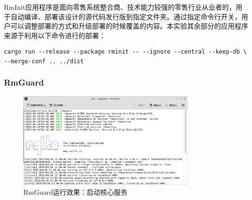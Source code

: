  RmInit应用程序是面向零售系统整合商、技术能力较强的零售行业从业者的，用于自动编译、部署该设计的源代码发行版到指定文件夹。通过指定命令行开关，用户可以调整部署的方式和升级部署的时候覆盖的内容。本实验其余部分的应用程序来源于利用以下命令进行的部署：

\begin{verbatim}
cargo run --release --package rminit -- --ignore --central --keep-db \
--merge-conf .. ../dist
\end{verbatim}

\subsubsection{RmGuard}

\begin{figure}[htbp]
	\centering
	\includegraphics[width=0.8\textwidth]{./exp/rmg-core.png}
	\caption{RmGuard运行效果：启动核心服务}
	\label{fig:rmg-core}
\end{figure}

